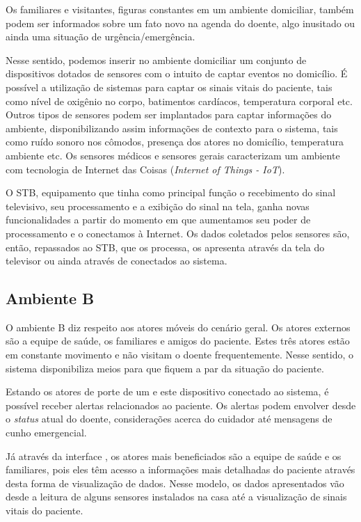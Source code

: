Os familiares e visitantes, figuras constantes em um ambiente domiciliar, também
podem ser informados sobre um fato novo na agenda do doente, algo inusitado ou 
ainda uma situação de urgência/emergência.

Nesse sentido, podemos inserir no ambiente domiciliar um conjunto de
dispositivos dotados de sensores com o intuito de captar eventos no domicílio. É
possível a utilização de sistemas para captar os sinais vitais do paciente, tais
como nível de oxigênio no corpo, batimentos cardíacos, temperatura corporal etc.
Outros tipos de sensores podem ser implantados para captar informações do
ambiente, disponibilizando assim informações de contexto para o sistema,  tais
como ruído sonoro nos cômodos, presença dos atores no domicílio, temperatura
ambiente etc. Os sensores médicos e sensores gerais caracterizam um  ambiente 
com tecnologia de Internet das Coisas (\textit{Internet of Things  - IoT}).

O STB, equipamento que tinha como principal função o recebimento do sinal
televisivo, seu processamento e a exibição do sinal na tela, ganha novas
funcionalidades a partir do momento em que aumentamos seu  poder de
processamento e o conectamos à Internet. Os dados coletados pelos sensores são,
então, repassados ao STB, que os processa, os apresenta através da tela do
televisor ou ainda através de \smartphones[] conectados ao sistema.

\subsection{Ambiente B} \label{subsec:ambiente-b}

O ambiente B diz respeito aos atores móveis do cenário geral. Os atores externos
são a equipe de saúde, os familiares e amigos do paciente. Estes três atores
estão em constante movimento e não visitam o doente frequentemente. Nesse
sentido, o sistema disponibiliza meios para que fiquem a par da situação do
paciente.

Estando os atores de porte de um \smartphone[] e este dispositivo conectado ao
sistema, é possível receber alertas relacionados ao paciente. Os alertas podem
envolver desde o \textit{status} atual do doente, considerações acerca do
cuidador até mensagens de cunho emergencial.

Já através da interface \web[], os atores mais beneficiados são a equipe de
saúde e os familiares, pois eles têm acesso a informações mais detalhadas do
paciente através desta forma de visualização de dados. Nesse modelo, os dados
apresentados vão desde a leitura de alguns sensores instalados na casa até a
visualização de sinais vitais do paciente.

